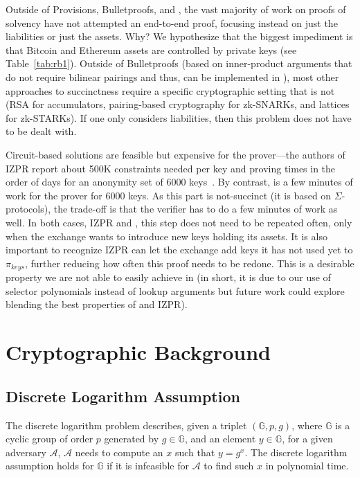 Outside of Provisions, Bulletproofs, and \Sys, the vast majority of work on proofs of solvency have not attempted an end-to-end proof, focusing instead on just the liabilities or just the assets. Why? We hypothesize that the biggest impediment is that Bitcoin and Ethereum assets are controlled by \secp private keys (see Table~\ref{tab:rb1}). Outside of Bulletproofs (based on inner-product arguments that do not require bilinear pairings and thus, can be implemented in \secp), most other approaches to succinctness require a specific cryptographic setting that is not \secp (\ie RSA for accumulators, pairing-based cryptography for zk-SNARKs, and lattices for zk-STARKs). If one only considers liabilities, then this problem does not have to be dealt with.

Circuit-based solutions are feasible but expensive for the prover---the authors of IZPR report about 500K constraints needed per key and proving times in the order of days for an anonymity set of 6000 keys~\cite{izpr}. By contrast, \Sys is a few minutes of work for the prover for 6000 keys. As this part is not-succinct (it is based on $\Sigma$-protocols), the trade-off is that the verifier has to do a few minutes of work as well. In both cases, IZPR and \Sys, this step does not need to be repeated often, only when the exchange wants to introduce new keys holding its assets. It is also important to recognize IZPR can let the exchange add keys it has not used yet to $\pi_{keys}$, further reducing how often this proof needs to be redone. This is a desirable property we are not able to easily achieve in \Sys (in short, it is due to our  use of selector polynomials instead of lookup arguments but future work could explore blending the best properties of \Sys and IZPR). 

\FloatBarrier

\FloatBarrier


\section{Cryptographic Background}

\subsection{Discrete Logarithm Assumption}
\label{sec:dlp}
The discrete logarithm problem describes, given a triplet $(\mathbb{G}, p, g)$, where $\mathbb{G}$ is a cyclic group of order $p$ generated by $g\in\mathbb{G}$, and an element $y\in\mathbb{G}$, for a given adversary $\mathcal{A}$, $\mathcal{A}$ needs to compute an $x$ such that $y=g^x$. The discrete logarithm assumption holds for $\mathbb{G}$ if it is infeasible for $\mathcal{A}$ to find such $x$ in polynomial time.


